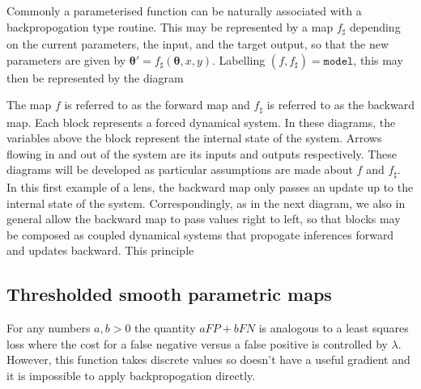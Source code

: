 \documentclass[10pt,a4paper]{article}
\begin{document}
Commonly a parameterised function can be naturally associated with a backpropogation type routine.
This may be represented by a map $f_\sharp$ depending on the current parameters, the input, and the target output, so that the new parameters are given by $\boldsymbol\theta'=f_\sharp(\boldsymbol\theta,x,y)$.
Labelling $(f,f_\sharp)=\texttt{model}$, this may then be represented by the diagram
\begin{figure}[H]
\centering
{}
\end{figure}
The map $f$ is referred to as the forward map and $f_\sharp$ is referred to as the backward map.
Each block represents a forced dynamical system.
In these diagrams, the variables above the block represent the internal state of the system.
Arrows flowing in and out of the system are its inputs and outputs respectively.
These diagrams will be developed as particular assumptions are made about $f$ and $f_\sharp$.
In this first example of a lens, the backward map only passes an update up to the internal state of the system.
Correspondingly, as in the next diagram, we also in general allow the backward map to pass values right to left, so that blocks may be composed as coupled dynamical systems that propogate inferences forward and updates backward.
This principle 
\subsection{Thresholded smooth parametric maps}
For any numbers $a,b>0$ the quantity $aFP+bFN$ is analogous to a least squares loss where the cost for a false negative versus a false positive is controlled by $\lambda$.
However, this function takes discrete values so doesn't have a useful gradient and it is impossible to apply backpropogation directly.
\end{document}
